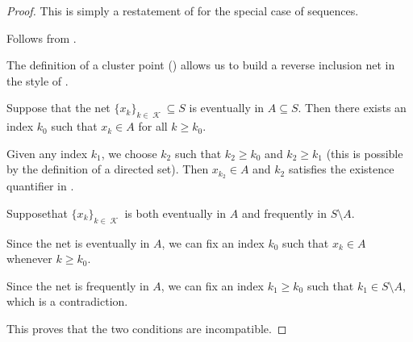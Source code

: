\begin{proof}
   This is simply a restatement of  for the special case of sequences.

   Follows from .

  The definition of a cluster point () allows us to build a reverse inclusion net in the style of .

   Suppose that the net \( \{ x_k \}_{k \in \mscrK} \subseteq S \) is eventually in \( A \subseteq S \). Then there exists an index \( k_0 \) such that \( x_k \in A \) for all \( k \geq k_0 \).

  Given any index \( k_1 \), we choose \( k_2 \) such that \( k_2 \geq k_0 \) and \( k_2 \geq k_1 \) (this is possible by the definition of a directed set). Then \( x_{k_2} \in A \) and \( k_2 \) satisfies the existence quantifier in .

   Suppose\DNE that \( \{ x_k \}_{k \in \mscrK} \) is both eventually in \( A \) and frequently in \( S \setminus A \).

  Since the net is eventually in \( A \), we can fix an index \( k_0 \) such that \( x_k \in A \) whenever \( k \geq k_0 \).

  Since the net is frequently in \( A \), we can fix an index \( k_1 \geq k_0 \) such that \( k_1 \in S \setminus A \), which is a contradiction.

  This proves that the two conditions are incompatible.
\end{proof}

